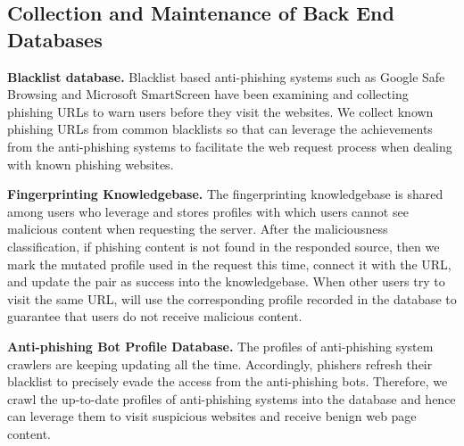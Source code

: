 \subsection{Collection and Maintenance of Back End Databases}

\noindent
\textbf{Blacklist database.}
Blacklist based anti-phishing systems such as Google Safe Browsing and Microsoft SmartScreen have been examining and collecting phishing URLs to warn users before they visit the websites.
We collect known phishing URLs from common blacklists so that \spartacus can leverage the achievements from the anti-phishing systems to facilitate the web request process when dealing with known phishing websites.

\noindent
\textbf{Fingerprinting Knowledgebase.}
The fingerprinting knowledgebase is shared among users who leverage \spartacus and stores profiles with which users cannot see malicious content when requesting the server.
After the maliciousness classification, if phishing content is not found in the responded source, then we mark the mutated profile used in the request this time, connect it with the URL, and update the pair as success into the knowledgebase.
When other users try to visit the same URL, \spartacus will use the corresponding profile recorded in the database to guarantee that users do not receive malicious content.

\noindent
\textbf{Anti-phishing Bot Profile Database.}
The profiles of anti-phishing system crawlers are keeping updating all the time.
Accordingly, phishers refresh their blacklist to precisely evade the access from the anti-phishing bots.
Therefore, we crawl the up-to-date profiles of anti-phishing systems into the database and hence \spartacus can leverage them to visit suspicious websites and receive benign web page content.



